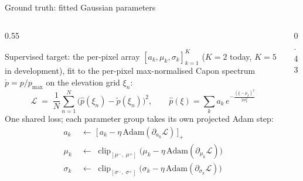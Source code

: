 \documentclass[aspectratio=169,9pt]{beamer}
\begin{document}
\begin{frame}{Ground truth: fitted Gaussian parameters}
  \small
  \begin{columns}[T]
    \begin{column}{0.55\textwidth}
      \begin{minipage}[t][0.68\textheight]{\linewidth}
      \vfill
      Supervised target: the per-pixel array $[a_k,\mu_k,\sigma_k]_{k=1}^{K}$
      ($K{=}2$ today, $K{=}5$ in development), fit to the per-pixel max-normalised
      Capon spectrum $\tilde p = p/p_{\max}$ on the elevation grid $\xi_n$:
      \[
        \mathcal{L} \;=\; \frac{1}{N}\sum_{n=1}^{N}\big(\hat p(\xi_n)-\tilde p(\xi_n)\big)^{2},
        \qquad
        \hat p(\xi) = \sum_{k} a_k\, e^{-\frac{(\xi-\mu_k)^2}{2\sigma_k^2}}
      \]
      \vfill
      One shared loss; each parameter group takes its own projected Adam step:
      \[
        \begin{aligned}
          a_k      &\;\leftarrow\; \big[\, a_k - \eta\,\mathrm{Adam}(\partial_{a_k}\mathcal{L}) \,\big]_{+} \\[-1pt]
          \mu_k    &\;\leftarrow\; \operatorname{clip}_{[\mu^-\!,\;\mu^+]}\big( \mu_k - \eta\,\mathrm{Adam}(\partial_{\mu_k}\mathcal{L}) \big) \\[-1pt]
          \sigma_k &\;\leftarrow\; \operatorname{clip}_{[\sigma^-\!,\;\sigma^+]}\big( \sigma_k - \eta\,\mathrm{Adam}(\partial_{\sigma_k}\mathcal{L}) \big)
        \end{aligned}
      \]
      \vfill
      \end{minipage}
    \end{column}
    \begin{column}{0.43\textwidth}
      \centering
\end{column}
\end{columns}
\end{frame}
\end{document}
